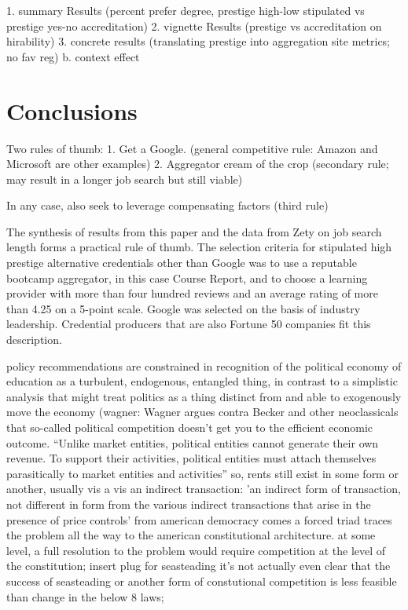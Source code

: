 \documentclass[review]{elsarticle}
\begin{document}


1. summary Results (percent prefer degree, prestige high-low stipulated vs prestige yes-no accreditation)
2. vignette Results (prestige vs accreditation on hirability)
3. concrete results (translating prestige into aggregation site metrics; no fav reg)
    b. context effect

\section{Conclusions}

Two rules of thumb:
1. Get a Google. (general competitive rule: Amazon and Microsoft are other examples)
2. Aggregator cream of the crop (secondary rule; may result in a longer job search but still viable)

In any case, also seek to leverage compensating factors (third rule)

The synthesis of results from this paper and the data from Zety on job search length forms a practical rule of thumb.
The selection criteria for stipulated high prestige alternative credentials other than Google was to use a reputable bootcamp aggregator,
in this case Course Report,
and to choose a learning provider with more than four hundred reviews and an average rating of more than 4.25 on a 5-point scale.
Google was selected on the basis of industry leadership.
Credential producers that are also Fortune 50 companies fit this description.

policy recommendations are constrained in recognition of the political economy of education as a turbulent, endogenous, entangled thing,
in contrast to a simplistic analysis that might treat politics as a thing distinct from and able to exogenously move the economy
(wagner: %
Wagner argues contra Becker and other neoclassicals that so-called political competition doesn't get you to the efficient economic outcome.
``Unlike market entities, political entities cannot generate their own revenue.
To support their activities, political entities must attach themselves parasitically to
market entities and activities''
so, rents still exist in some form or another, usually vis a vis an indirect transaction:
'an indirect form of transaction, not different in form from the various indirect transactions that arise in the presence of price controls'
from american democracy comes a forced triad
traces the problem all the way to the american constitutional architecture.
at some level, a full resolution to the problem would require competition at the level of the constitution; insert plug for seasteading
it's not actually even clear that the success of seasteading or another form of constutional competition is less feasible than
change in the below 8 laws;
\end{document}
